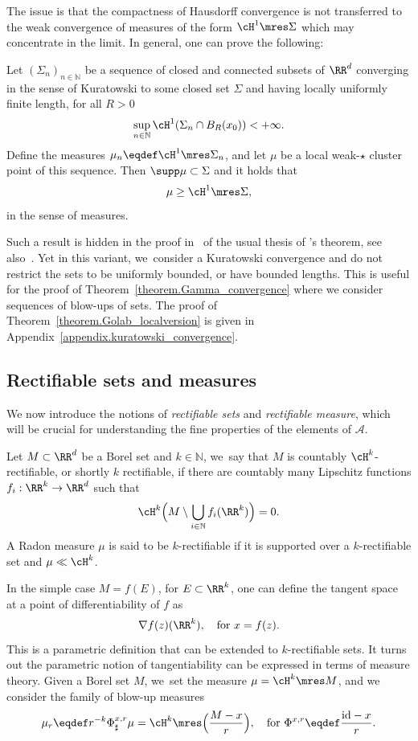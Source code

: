 The issue is that the compactness of Hausdorff convergence is not transferred to the weak convergence of measures of the form $\cH^1\mres \Sigma$ which may concentrate in the limit.
In general, one can prove the following:
\begin{theorem}\label{theorem.Golab_localversion}
Let ${(\Sigma_n)}_{n \in \mathbb{N}}$ be a sequence of closed and connected subsets of $\RR^d$ converging in the sense of Kuratowski to some closed set $\Sigma$ and having locally uniformly finite length, \ie for all $R > 0$
\[
\sup_{n \in \mathbb{N}} \cH^1(\Sigma_n \cap B_R(x_0)) < +\infty.
\]
Define the measures $\mu_n \eqdef \cH^1\mres \Sigma_n$, and let $\mu$ be a local weak-$\star$ cluster point of this sequence. Then $\supp\mu \subset \Sigma$ and it holds that
\[
\mu \ge \cH^1\mres \Sigma,
\]
in the sense of measures.
\end{theorem}
Such a result is hidden in the proof in~\cite{ambrosio2004topics} of the usual thesis of \Golab's theorem, see also~\cite{paolini2013existence}. Yet in this variant, we~consider a Kuratowski convergence and do not restrict the sets to be uniformly bounded, or have bounded lengths.
This is useful for the proof of Theorem~\ref{theorem.Gamma_convergence} where we consider sequences of blow-ups of sets. The proof of Theorem~\ref{theorem.Golab_localversion} is given in Appendix~\ref{appendix.kuratowski_convergence}.

\subsection{Rectifiable sets and measures}
We now introduce
the notions of \emph{rectifiable sets} and \emph{rectifiable measure}, which will be crucial for understanding the fine
properties of the elements of $\mathcal{A}$.
\begin{definition}
Let $M \subset \RR^d$ be a Borel set and $k \in \mathbb{N}$, we~say that $M$ is countably $\cH^k$-rectifiable, or shortly $k$ rectifiable, if there are countably many Lipschitz functions $f_i: \RR^k \to \RR^d$ such that
\[
\cH^k\Bigl(
M \setminus \bigcup_{i \in \mathbb{N}} f_i(\RR^k)
\Bigr)
= 0.
\]
A Radon measure $\mu$ is said to be $k$-rectifiable if it is supported over a $k$-rectifiable set and $\mu \ll \cH^k$.
\end{definition}

In the simple case $M = f(E)$, for $E \subset \RR^k$, one can define the tangent space at a point of differentiability of $f$ as
\[
\nabla f(z)(\RR^k), \quad\text{for $x = f(z)$}.
\]
This is a parametric definition that can be extended to $k$-rectifiable sets. It turns out the parametric notion of tangentiability can be expressed in terms of measure theory. Given a Borel set $M$, we~set the measure $\mu = \cH^k\mres M$, and we consider the family of blow-up measures
\begin{equation}\label{blowup_measure_operator}
\mu_r \eqdef r^{-k} \Phi^{x,r}_\sharp \mu = \cH^k\mres \Bigl(\frac{M - x}{r}\Bigr), \quad\text{for }
\Phi^{x,r}\eqdef \frac{\text{id} - x}{r}.
\end{equation}

